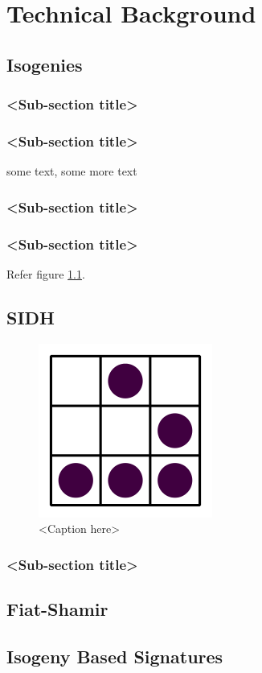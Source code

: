 \chapter{Technical Background}

\section{Isogenies}

\subsection{<Sub-section title>}

\subsection{<Sub-section title>}
some text\cite{citation-2-name-here}, some more text
\subsection{<Sub-section title>}

\subsection{<Sub-section title>}

Refer figure \ref{fig:label}.

\section{SIDH}

\begin{figure}[htb]
\centering
\includegraphics[scale=0.3]{glider} %
\caption{<Caption here>}
\label{fig:label} %
\end{figure}

\subsection{<Sub-section title>}


\section{Fiat-Shamir}

\section{Isogeny Based Signatures}

